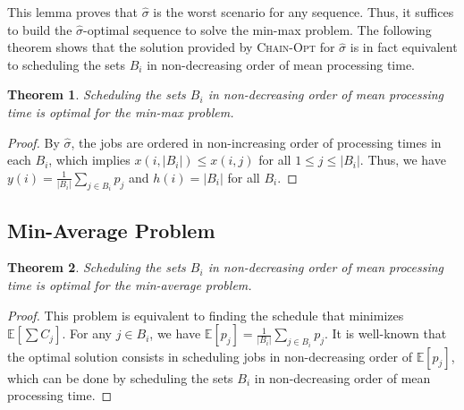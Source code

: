 \documentclass{article}
\newtheorem{theorem}{Theorem}
\newcommand{\E}{\mathbb{E}}
\begin{document}
This lemma proves that \(\hat{\sigma}\) is the worst scenario for any sequence.
Thus, it suffices to build the \(\hat{\sigma}\)-optimal sequence to solve the min-max problem.
The following theorem shows that the solution provided by \textsc{Chain-Opt} for \(\hat{\sigma}\) is in fact equivalent to scheduling the sets \(B_i\) in non-decreasing order of mean processing time.

\begin{theorem}
    Scheduling the sets \(B_i\) in non-decreasing order of mean processing time is optimal for the min-max problem.
\end{theorem}
\begin{proof}
    By \(\hat{\sigma}\), the jobs are ordered in non-increasing order of processing times in each \(B_i\), which implies \(x(i,|B_i|)\le x(i,j)\) for all \(1\le j\le |B_i|\).
    Thus, we have \(y(i)=\frac{1}{|B_i|} \sum_{j\in B_i} p_j\) and \(h(i)=|B_i|\) for all \(B_i\).
\end{proof}

\subsection{Min-Average Problem}

\begin{theorem}
    Scheduling the sets \(B_i\) in non-decreasing order of mean processing time is optimal for the min-average problem.
\end{theorem}
\begin{proof}
    This problem is equivalent to finding the schedule that minimizes \(\E\left[\sum C_j\right]\).
    For any \(j\in B_i\), we have \(\E\left[p_j\right]=\frac{1}{|B_i|}\sum_{j\in B_i} p_j\).
    It is well-known that the optimal solution consists in scheduling jobs in non-decreasing order of \(\E\left[p_j\right]\), which can be done by scheduling the sets \(B_i\) in non-decreasing order of mean processing time.
\end{proof}


\end{document}
